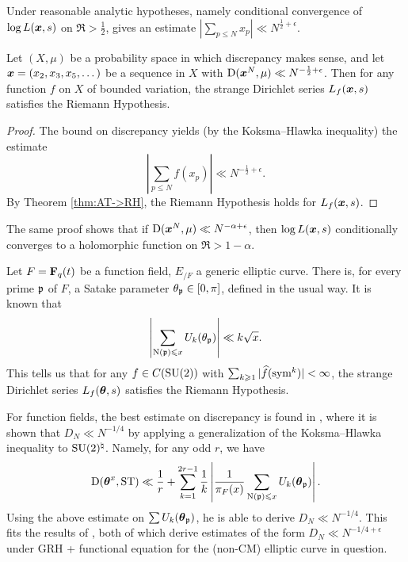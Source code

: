 Under reasonable analytic hypotheses, namely conditional convergence of 
$\log L({\boldsymbol x},s)$ on $\Re > \frac 1 2$, \cite[II.1 Th.~10]{tenenbaum-1995} gives 
an estimate $|\sum_{p\leqslant N} x_p| \ll N^{\frac 1 2 + \epsilon}$. 

\begin{theorem}
Let $(X,\mu)$ be a probability space in which discrepancy makes sense, and let 
${\boldsymbol x}=(x_2,x_3,x_5,\dots)$ be a sequence in $X$ with 
$\operatorname{D}({\boldsymbol x}^N,\mu) \ll N^{-\frac 1 2+\epsilon}$. Then for any function $f$ on 
$X$ of bounded variation, the strange Dirichlet series $L_f({\boldsymbol x},s)$ satisfies 
the Riemann Hypothesis. 
\end{theorem}
\begin{proof}
The bound on discrepancy yields (by the Koksma--Hlawka inequality) the estimate 
\[
	\left| \sum_{p\leqslant N} f(x_p)\right| \ll N^{-\frac 1 2+\epsilon} .
\]
By Theorem \ref{thm:AT->RH}, the Riemann Hypothesis holds for $L_f({\boldsymbol x},s)$. 
\end{proof}

The same proof shows that if $\operatorname{D}({\boldsymbol x}^N,\mu)\ll N^{-\alpha+\epsilon}$, then 
$\log L({\boldsymbol x},s)$ conditionally converges to a holomorphic function on 
$\Re > 1 - \alpha$. 

Let $F = \mathbf{F}_q(t)$ be a function field, $E_{/F}$ a generic elliptic curve. 
There is, for every prime $\mathfrak{p}$ of $F$, a Satake parameter 
$\theta_{\mathfrak{p}} \in [0,\pi]$, defined in the usual way. It is known 
\cite[Ch.~3]{katz-1988} that
\[
	\left|\sum_{\operatorname{N}(\mathfrak{p}) \leqslant x} U_k(\theta_{\mathfrak{p}}) \right| \ll k \sqrt{x} .
\]
This tells us that for any $f\in C(\operatorname{SU}(2))$ with 
$\sum_{k\geqslant 1} |\widehat f(\operatorname{sym}^k)|<\infty$, the strange Dirichlet 
series $L_f({\boldsymbol\theta},s)$ satisfies the Riemann Hypothesis. 

For function fields, the best estimate on discrepancy is found in 
\cite{niederreiter-1991}, where it is shown that $D_N \ll N^{-1/4}$ 
by applying a generalization of the Koksma--Hlawka inequality to 
$\operatorname{SU}(2)^\natural$. Namely, for any odd $r$, we have 
\[
	\operatorname{D}({\boldsymbol\theta}^x,\mathrm{ST}) \ll \frac 1 r + \sum_{k=1}^{2 r -1} \frac 1 k \left| \frac{1}{\pi_F(x)} \sum_{\operatorname{N}(\mathfrak{p})\leqslant x} U_k({\boldsymbol\theta}_{\mathfrak{p}})\right| .
\]
Using the above estimate on $\sum U_k({\boldsymbol\theta}_{\mathfrak{p}})$, he is able to derive 
$D_N \ll N^{-1/4}$. This fits the results of 
\cite{bucar-kedlaya-2015,rouse-thorner-2016}, both of which derive estimates 
of the form $D_N \ll N^{-1/4+\epsilon}$ under GRH + functional equation for 
the (non-CM) elliptic curve in question. 
